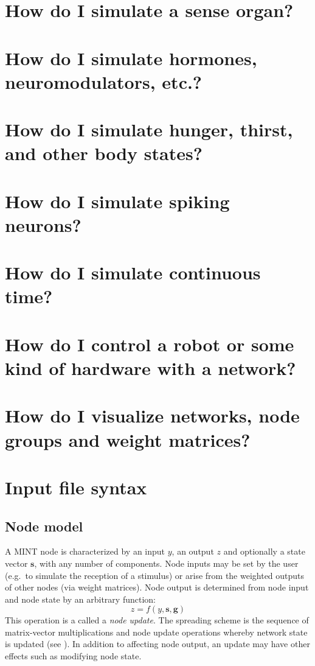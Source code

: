 \documentclass[12pt,letterpaper]{memoir}
\let\fref\relax%
\newcommand{\mint}{MINT\xspace}
\renewcommand{\vec}[1]{\ensuremath{\mathbf#1}\xspace}
\begin{document}
\section{How do I simulate a sense organ?}
\label{sec:sense-organ}

\section{How do I simulate hormones, neuromodulators, etc.?}
\label{sec:hormones-etc}

\section{How do I simulate  hunger, thirst, and other body states?}
\label{sec:body-states}

\section{How do I simulate spiking neurons?}
\label{sec:spiking}

\section{How do I simulate continuous time?}
\label{sec:continuous-time}

\section{How do I control a robot or some kind of hardware with a network?}
\label{sec:hardware-control}

\section{How do I visualize networks, node groups and weight
  matrices?}
\label{sec:network-analysis}

\section{Input file syntax}

\subsection{Node model}
\label{sec:nodemodel}
A \mint node is characterized by an input $y$, an output $z$ and
optionally a state vector $\vec s$, with any number of components.
Node inputs may be set by the user (e.g.\ to simulate the reception of
a stimulus) or arise from the weighted outputs of other nodes (via
weight matrices). Node output is determined from node input and node
state by an arbitrary function:
\begin{equation}
  \label{eq:node-model}
  z = f( y, \vec s, \vec g )
\end{equation}
This operation is a called a \textit{node update}. The spreading
scheme is the sequence of matrix-vector multiplications and node
update operations whereby network state is updated (see
\fref{sec:spreading}). In addition to affecting node output, an update
may have other effects such as modifying node state.
\end{document}
